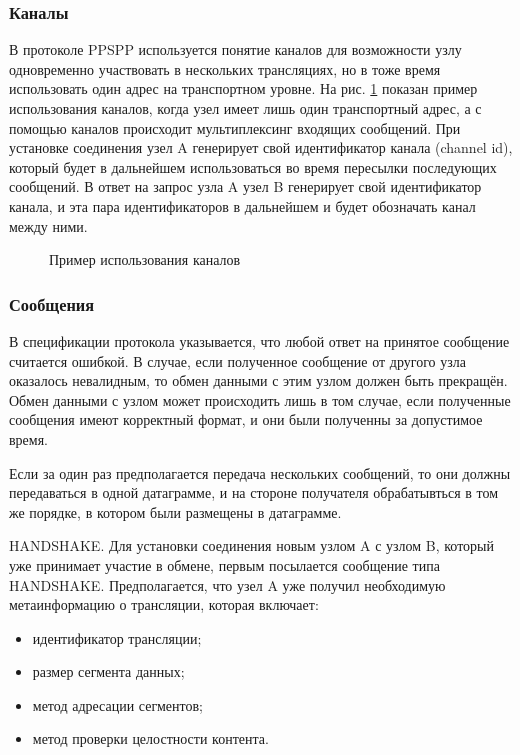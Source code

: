		\subsubsection{Каналы}
		В протоколе PPSPP используется понятие каналов для возможности узлу одновременно участвовать в нескольких
		трансляциях, но в тоже время использовать один адрес на транспортном уровне. На рис. \ref{img:ppspp-chanels}
		показан пример использования каналов, когда узел имеет лишь один транспортный адрес, а с помощью каналов
		происходит мультиплексинг входящих сообщений. При установке соединения узел A генерирует свой идентификатор
		канала (channel id), который будет в дальнейшем использоваться во время пересылки последующих сообщений. В ответ
		на запрос узла A узел B генерирует свой идентификатор канала, и эта пара идентификаторов в дальнейшем и будет
		обозначать канал между ними.

		\begin{figure}[h]
			\caption{Пример использования каналов}
			\label{img:ppspp-chanels}
		\end{figure}

		\subsubsection{Сообщения}
		В спецификации протокола указывается, что любой ответ на принятое сообщение считается ошибкой. В случае, если
		полученное сообщение от другого узла оказалось невалидным, то обмен данными с этим узлом должен быть прекращён.
		Обмен данными с узлом может происходить лишь в том случае, если полученные сообщения имеют корректный формат, и
		они были полученны за допустимое время.

		Если за один раз предполагается передача нескольких сообщений, то они должны передаваться в одной датаграмме, и
		на стороне получателя обрабатывться в том же порядке, в котором были размещены в датаграмме.

		HANDSHAKE. Для установки соединения новым узлом A с узлом B, который уже принимает участие в обмене,
		первым посылается сообщение типа HANDSHAKE. Предполагается, что узел A уже получил необходимую метаинформацию о
		трансляции, которая включает:
		\begin{itemize}
			\item идентификатор трансляции;
			\item размер сегмента данных;
			\item метод адресации сегментов;
			\item метод проверки целостности контента.
		\end{itemize}

